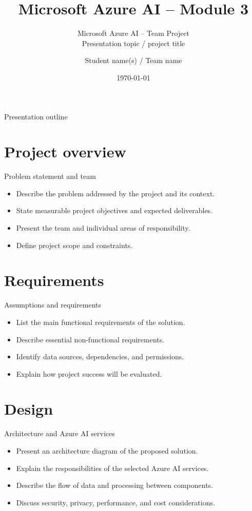 \documentclass[aspectratio=169,xcolor=dvipsnames]{beamer}
\title[Azure AI -- Module 3]{Microsoft Azure AI -- Module 3}
\subtitle{Microsoft Azure AI -- Team Project \\ Presentation topic / project title}
\author[Student / team]{Student name(s) / Team name}
\institute[SUT]{Faculty of Applied Mathematics\\Silesian University of Technology}
\date{\today}
\begin{document}
\begin{frame}
\titlepage
\end{frame}
\begin{frame}{Presentation outline}
\tableofcontents
\end{frame}
\section{Project overview}
\begin{frame}{Problem statement and team}
\begin{itemize}
\item Describe the problem addressed by the project and its context.
\item State measurable project objectives and expected deliverables.
\item Present the team and individual areas of responsibility.
\item Define project scope and constraints.
\end{itemize}
\end{frame}
\section{Requirements}
\begin{frame}{Assumptions and requirements}
\begin{itemize}
\item List the main functional requirements of the solution.
\item Describe essential non-functional requirements.
\item Identify data sources, dependencies, and permissions.
\item Explain how project success will be evaluated.
\end{itemize}
\end{frame}
\section{Design}
\begin{frame}{Architecture and Azure AI services}
\begin{itemize}
\item Present an architecture diagram of the proposed solution.
\item Explain the responsibilities of the selected Azure AI services.
\item Describe the flow of data and processing between components.
\item Discuss security, privacy, performance, and cost considerations.
\end{itemize}
\end{frame}
\end{document}
